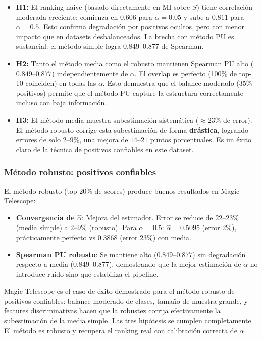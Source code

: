 \documentclass[a4paper,11pt]{article}
\begin{document}
\begin{itemize}
    \item \textbf{H1:} El ranking naive (basado directamente en MI sobre $S$) tiene correlación moderada creciente: comienza en $0.606$ para $\alpha=0.05$ y sube a $0.811$ para $\alpha=0.5$. Esto confirma degradación por positivos ocultos, pero con menor impacto que en datasets desbalanceados. La brecha con método PU es sustancial: el método simple logra $0.849$--$0.877$ de Spearman.
    
    \item \textbf{H2:} Tanto el método media como el robusto mantienen Spearman PU alto ($0.849$--$0.877$) independientemente de $\alpha$. El overlap es perfecto (100\% de top-10 coinciden) en todas las $\alpha$. Esto demuestra que el balance moderado (35\% positivos) permite que el método PU capture la estructura correctamente incluso con baja información.
    
    \item \textbf{H3:} El método media muestra subestimación sistemática ($\approx 23\%$ de error). El método robusto corrige esta subestimación de forma \textbf{drástica}, logrando errores de solo $2$--$9\%$, una mejora de $14$--$21$ puntos porcentuales. Es un éxito claro de la técnica de positivos confiables en este dataset.
\end{itemize}

\subsubsection{Método robusto: positivos confiables}

El método robusto (top 20\% de scores) produce buenos resultados en Magic Telescope:

\begin{itemize}
    \item \textbf{Convergencia de $\hat{\alpha}$}: Mejora del estimador. Error se reduce de $22$--$23\%$ (media simple) a $2$--$9\%$ (robusto). Para $\alpha=0.5$: $\hat{\alpha}=0.5095$ (error 2\%), prácticamente perfecto vs $0.3868$ (error 23\%) con media.
    
    \item \textbf{Spearman PU robusto}: Se mantiene alto ($0.849$--$0.877$) sin degradación respecto a media ($0.849$--$0.877$), demostrando que la mejor estimación de $\alpha$ no introduce ruido sino que estabiliza el pipeline.
\end{itemize}

Magic Telescope es el caso de éxito demostrado para el método robusto de positivos confiables: balance moderado de clases, tamaño de muestra grande, y features discriminativas hacen que la robustez corrija efectivamente la subestimación de la media simple. Las tres hipótesis se cumplen completamente. El método es robusto y recupera el ranking real con calibración correcta de $\alpha$.
\end{document}
